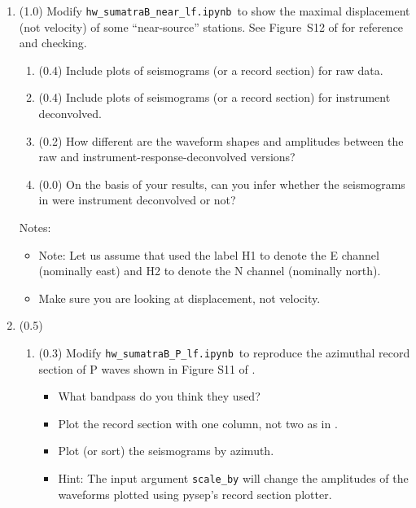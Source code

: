\documentclass[11pt,titlepage,fleqn]{article}
\newcommand{\tfilenearlf}{{\tt hw\_sumatraB\_near\_lf.ipynb}}
\newcommand{\tfileplf}{{\tt hw\_sumatraB\_P\_lf.ipynb}}
\begin{document}
\begin{enumerate}
\item (1.0) Modify \tfilenearlf\ to show the maximal displacement (not velocity) of some ``near-source'' stations. See Figure~S12 of \citet{Ammon2005} for reference and checking.

%
\begin{enumerate}
\item (0.4) Include plots of seismograms (or a record section) for raw data.
\item (0.4) Include plots of seismograms (or a record section) for instrument deconvolved.
\item (0.2) How different are the waveform shapes and amplitudes between the raw and instrument-response-deconvolved versions?
\item (0.0) On the basis of your results, can you infer whether the seismograms in \citet{Ammon2005} were instrument deconvolved or not?
\end{enumerate}
%
Notes:
%
\begin{itemize}
\item Note: Let us assume that \citet{Ammon2005} used the label H1 to denote the E channel (nominally east) and H2 to denote the N channel (nominally north).

\item Make sure you are looking at displacement, not velocity.

\end{itemize}


\pagebreak
\item (0.5) \ptag\
%
\begin{enumerate}
\item (0.3) Modify \tfileplf\ to reproduce the azimuthal record section of P waves shown in Figure S11 of \citet{Ammon2005}.
%
\begin{itemize}
\item What bandpass do you think they used?
\item Plot the record section with one column, not two as in \citet{Ammon2005}.
\item Plot (or sort) the seismograms by azimuth.
\item Hint: The input argument \verb+scale_by+ will change the amplitudes of the waveforms plotted using pysep's record section plotter.
\end{itemize}


\end{enumerate}
\end{enumerate}
\end{document}
